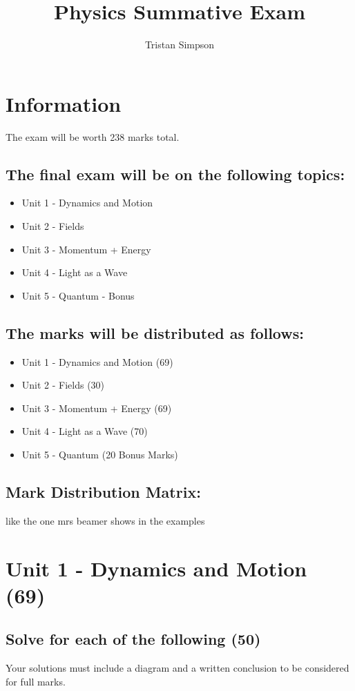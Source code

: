 \documentclass{article}
\title{Physics Summative Exam}
\author{Tristan Simpson}
\begin{document}
\maketitle
\tableofcontents
\doublespacing

\section{Information}
The exam will be worth 238 marks total.
\subsection*{The final exam will be on the following topics:}
\begin{itemize}
    \item Unit 1 - Dynamics and Motion
    \item Unit 2 - Fields
    \item Unit 3 - Momentum + Energy
    \item Unit 4 - Light as a Wave
    \item Unit 5 - Quantum - Bonus
\end{itemize}
\subsection*{The marks will be distributed as follows:}
\begin{itemize}
    \item Unit 1 - Dynamics and Motion (69)
    \item Unit 2 - Fields (30)
    \item Unit 3 - Momentum + Energy (69)
    \item Unit 4 - Light as a Wave (70)
    \item Unit 5 - Quantum (20 Bonus Marks)
\end{itemize}
\subsection*{Mark Distribution Matrix:}
like the one mrs beamer shows in the examples

\section{Unit 1 - Dynamics and Motion (69)}
\subsection{Solve for each of the following (50)}
Your solutions must include a diagram and a written conclusion to be considered for full marks.
\end{document}
